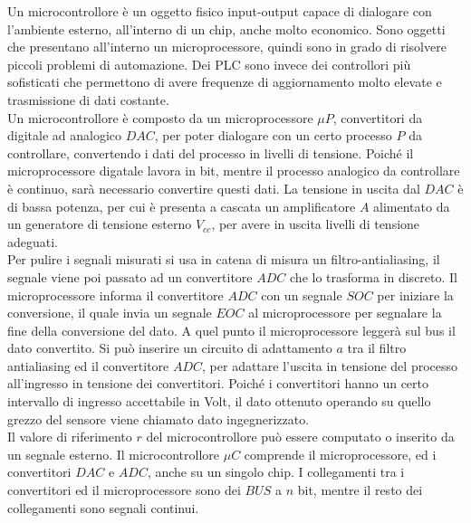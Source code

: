 \documentclass{article}
\numberwithin{equation}{subsection}
\begin{document}
Un microcontrollore è un oggetto fisico input-output capace di dialogare con l'ambiente esterno, all'interno di un chip, anche molto economico. Sono oggetti che presentano 
all'interno un microprocessore, quindi sono in grado di risolvere piccoli problemi di automazione. Dei PLC sono invece dei controllori più sofisticati che permettono di 
avere frequenze di aggiornamento molto elevate e trasmissione di dati costante. 
\\
Un microcontrollore è composto da un microprocessore $\mu P$, convertitori da digitale ad analogico $DAC$, per poter dialogare con un certo processo $P$ da controllare, 
convertendo i dati del processo in livelli di tensione. Poiché il microprocessore digatale lavora in bit, mentre il processo analogico da controllare è continuo, sarà 
necessario convertire questi dati. La tensione in uscita dal $DAC$ è di bassa potenza, per cui è presenta a cascata un amplificatore $A$ alimentato da un 
generatore di tensione esterno $V_{cc}$, per avere in uscita livelli di tensione adeguati. 
\\
Per pulire i segnali misurati si usa in catena di misura un filtro-antialiasing, il segnale viene poi passato ad un convertitore $ADC$ che lo trasforma in discreto. 
Il microprocessore informa il convertitore 
$ADC$ con un segnale $SOC$ per iniziare la conversione, il quale invia un segnale $EOC$ al microprocessore per segnalare la fine della conversione del dato. A quel punto 
il microprocessore leggerà sul bus il dato convertito. Si può inserire un circuito di adattamento $a$ tra il filtro antialiasing ed il convertitore $ADC$, per adattare 
l'uscita in tensione del processo all'ingresso in tensione dei convertitori. Poiché i convertitori hanno un certo intervallo di ingresso accettabile in Volt, il dato 
ottenuto operando su quello grezzo del sensore viene chiamato dato ingegnerizzato. 
\\
Il valore di riferimento $r$ del microcontrollore può essere computato o inserito da un segnale esterno. Il microcontrollore $\mu C$ comprende il microprocessore, ed i convertitori 
$DAC$ e $ADC$, anche su un singolo chip. I collegamenti tra i convertitori ed il microprocessore sono dei $BUS$ a $n$ bit, mentre il resto dei collegamenti sono 
segnali continui. 
\end{document}
